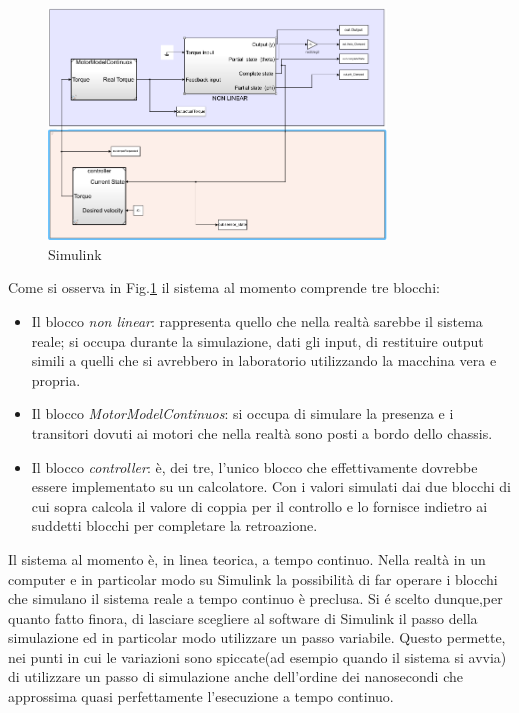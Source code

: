 \begin{figure}[H]
	\centering   	
	\includegraphics[width=0.8\textwidth]{Immagini/simulink_model_continuos.png}
	\caption{Simulink}
	\label{fig:simulink}
\end{figure}
Come si osserva in Fig.\ref{fig:simulink} il sistema al momento comprende tre blocchi:
\begin{itemize}
	\item Il blocco \textit{non linear}: rappresenta quello che nella realtà sarebbe il sistema reale; si occupa durante la simulazione, dati gli input, di restituire output simili a quelli che si avrebbero in laboratorio utilizzando la macchina vera e propria.
	\item Il blocco \textit{MotorModelContinuos}: si occupa di simulare la presenza e i transitori dovuti ai motori che nella realtà sono posti a bordo dello chassis.
	\item Il blocco \textit{controller}: è, dei tre, l'unico blocco che effettivamente dovrebbe essere implementato su un calcolatore. Con i valori simulati dai due blocchi di cui sopra calcola il valore di coppia per il controllo e lo fornisce indietro ai suddetti blocchi per completare la retroazione.
\end{itemize}
Il sistema al momento è, in linea teorica, a tempo continuo. Nella realtà in un computer e in particolar modo su Simulink la possibilità di far operare i blocchi che simulano il sistema reale a tempo continuo è preclusa.
Si é scelto dunque,per quanto fatto finora, di lasciare scegliere al software di Simulink il passo della simulazione ed in particolar modo utilizzare un passo variabile. Questo permette, nei punti in cui le variazioni sono spiccate(ad esempio quando il sistema si avvia) di utilizzare un passo di simulazione anche dell'ordine dei nanosecondi che approssima quasi perfettamente l'esecuzione a tempo continuo.

